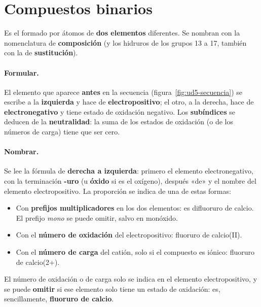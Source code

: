 \section{Compuestos binarios}\label{sec:ud5-binarios}

\begin{definition}
    Es el formado por átomos de \textbf{dos elementos} diferentes. Se nombran con la nomenclatura de \textbf{composición} (y
    los hidruros de los grupos 13 a 17, también con la de \textbf{sustitución}).
\end{definition}

\paragraph{Formular.} El elemento que aparece \textbf{antes} en la secuencia (figura~\ref{fig:ud5-secuencia}) se escribe a la
\textbf{izquierda} y hace de \textbf{electropositivo}; el otro, a la derecha, hace de \textbf{electronegativo} y tiene estado de
oxidación negativo. Los \textbf{subíndices} se deducen de la \textbf{neutralidad}: la suma de los estados de oxidación (o de los
números de carga) tiene que ser cero.

\paragraph{Nombrar.} Se lee la fórmula de \textbf{derecha a izquierda}: primero el elemento electronegativo, con la terminación
\textbf{-uro} (u \textbf{óxido} si es el oxígeno), después «de» y el nombre del elemento electropositivo. La proporción se
indica de una de estas formas:
\begin{itemize}
    \item Con \textbf{prefijos multiplicadores} en los dos elementos:  es difluoruro de calcio. El prefijo
    \textit{mono} se puede omitir, salvo en monóxido.
    \item Con el \textbf{número de oxidación} del electropositivo: fluoruro de calcio(II).
    \item Con el \textbf{número de carga} del catión, solo si el compuesto es iónico: fluoruro de calcio(2+).
\end{itemize}
El número de oxidación o de carga solo se indica en el elemento electropositivo, y se puede \textbf{omitir} si ese elemento
solo tiene un estado de oxidación:  es, sencillamente, \textbf{fluoruro de calcio}.

